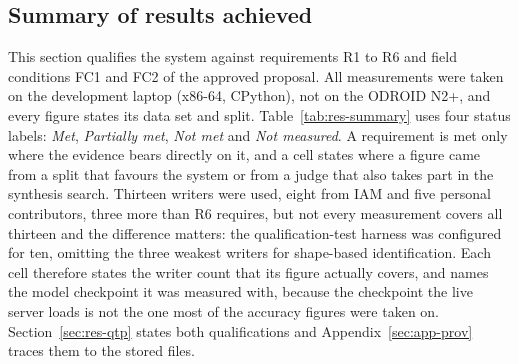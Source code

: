 \label{sec:results}
\providecommand{\nym}{{\color{red}\bfseries [NOT YET MEASURED]}}
\providecommand{\xh}{x_{\mathrm{h}}}
\providecommand{\NoHumanPanel}{%
\textbf{Not carried out.} The blind human panel of eight raters, the Fleiss kappa
agreement measure and the live demonstration of the proposal were not executed,
so the third and fourth sub-tests of this qualification test remain
\nym{}. The feature-correlation and overlay sub-tests above measure geometric and
pixel-domain distances between the synthesis and the writers' real hands. No
measurement of human acceptance of the output was taken, and the proposal's
demonstration asks for one; Section~\ref{sec:discussion} treats what that
leaves unproven.}

\subsection{Summary of results achieved} %
\label{sec:res-summary}

This section qualifies the system against requirements R1 to R6 and field conditions FC1 and FC2 of the approved proposal.
All measurements were taken on the development laptop (x86-64, CPython), not on the ODROID N2+, and every figure states its data set and split.
Table~\ref{tab:res-summary} uses four status labels: \emph{Met}, \emph{Partially met}, \emph{Not met} and \emph{Not measured}.
A requirement is met only where the evidence bears directly on it, and a cell states where a figure came from a split that favours the system or from a judge that also takes part in the synthesis search.
Thirteen writers were used, eight from IAM and five personal contributors, three more than R6 requires, but not every measurement covers all thirteen and the difference matters: the qualification-test harness was configured for ten, omitting the three weakest writers for shape-based identification.
Each cell therefore states the writer count that its figure actually covers, and names the model checkpoint it was measured with, because the checkpoint the live server loads is not the one most of the accuracy figures were taken on.
Section~\ref{sec:res-qtp} states both qualifications and Appendix~\ref{sec:app-prov} traces them to the stored files.


